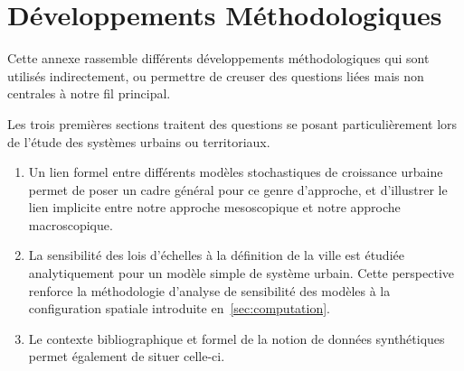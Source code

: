 



\chapter{Développements Méthodologiques}




\label{app:methodology} %







Cette annexe rassemble différents développements méthodologiques qui sont utilisés indirectement, ou permettre de creuser des questions liées mais non centrales à notre fil principal.

Les trois premières sections traitent des questions se posant particulièrement lors de l'étude des systèmes urbains ou territoriaux.
\begin{enumerate}
	\item Un lien formel entre différents modèles stochastiques de croissance urbaine permet de poser un cadre général pour ce genre d'approche, et d'illustrer le lien implicite entre notre approche mesoscopique et notre approche macroscopique.
	\item La sensibilité des lois d'échelles à la définition de la ville est étudiée analytiquement pour un modèle simple de système urbain. Cette perspective renforce la méthodologie d'analyse de sensibilité des modèles à la configuration spatiale introduite en~\ref{sec:computation}.
	\item Le contexte bibliographique et formel de la notion de données synthétiques permet également de situer celle-ci.
\end{enumerate}

